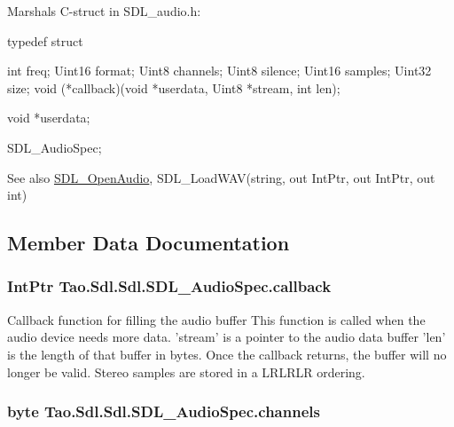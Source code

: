 Marshals C-\/struct in SDL\_\-audio.h: 
\begin{DoxyCode}
              typedef struct{
                        int freq;
                        Uint16 format;
                        Uint8 channels;
                        Uint8 silence;
                        Uint16 samples;
                        Uint32 size;
                        void (*callback)(void *userdata, Uint8 *stream, int len);
      
                        void *userdata;
                } SDL_AudioSpec;
\end{DoxyCode}


\begin{DoxySeeAlso}{See also}
\hyperlink{_sdl_8cs_ad374c9d61753113b30c8c4b96295ff3b}{SDL\_\-OpenAudio}, SDL\_\-LoadWAV(string, out IntPtr, out IntPtr, out int)


\end{DoxySeeAlso}


\subsection{Member Data Documentation}
\hypertarget{struct_tao_1_1_sdl_1_1_sdl_1_1_s_d_l___audio_spec_a7c40815285a5f088ef41c0d80c01bac6}{
\subsubsection[{callback}]{\setlength{\rightskip}{0pt plus 5cm}IntPtr {\bf Tao.Sdl.Sdl.SDL\_\-AudioSpec.callback}}}
\label{struct_tao_1_1_sdl_1_1_sdl_1_1_s_d_l___audio_spec_a7c40815285a5f088ef41c0d80c01bac6}


Callback function for filling the audio buffer This function is called when the audio device needs more data. 'stream' is a pointer to the audio data buffer 'len' is the length of that buffer in bytes. Once the callback returns, the buffer will no longer be valid. Stereo samples are stored in a LRLRLR ordering. 

\hypertarget{struct_tao_1_1_sdl_1_1_sdl_1_1_s_d_l___audio_spec_a36913675d6c995183e7653f9925bd5ef}{
\subsubsection[{channels}]{\setlength{\rightskip}{0pt plus 5cm}byte {\bf Tao.Sdl.Sdl.SDL\_\-AudioSpec.channels}}}
\label{struct_tao_1_1_sdl_1_1_sdl_1_1_s_d_l___audio_spec_a36913675d6c995183e7653f9925bd5ef}


